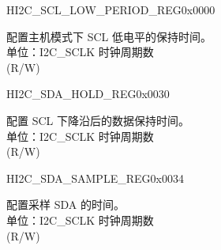 \begin{register}{H}{I2C\_SCL\_LOW\_PERIOD\_REG}{0x0000}\label{regdesc:I2CSCLLOWPERIODREG}
%
%
\regnewline%
\begin{regdesc}\begin{reglist}
\label{fielddesc:I2CSCLLOWPERIOD}\item [I2C\_SCL\_LOW\_PERIOD] 配置主机模式下 SCL 低电平的保持时间。\\
单位：I2C\_SCLK 时钟周期数 \\ (R/W)
\end{reglist}\end{regdesc}
\end{register}


\begin{register}{H}{I2C\_SDA\_HOLD\_REG}{0x0030}\label{regdesc:I2CSDAHOLDREG}
%
%
\regnewline%
\begin{regdesc}\begin{reglist}
\label{fielddesc:I2CSDAHOLDTIME}\item [I2C\_SDA\_HOLD\_TIME] 配置 SCL 下降沿后的数据保持时间。\\
单位：I2C\_SCLK 时钟周期数 \\ (R/W)
\end{reglist}\end{regdesc}
\end{register}


\begin{register}{H}{I2C\_SDA\_SAMPLE\_REG}{0x0034}\label{regdesc:I2CSDASAMPLEREG}
%
%
\regnewline%
\begin{regdesc}\begin{reglist}
\label{fielddesc:I2CSDASAMPLETIME}\item [I2C\_SDA\_SAMPLE\_TIME] 配置采样 SDA 的时间。\\
单位：I2C\_SCLK 时钟周期数 \\ (R/W)
\end{reglist}\end{regdesc}
\end{register}



